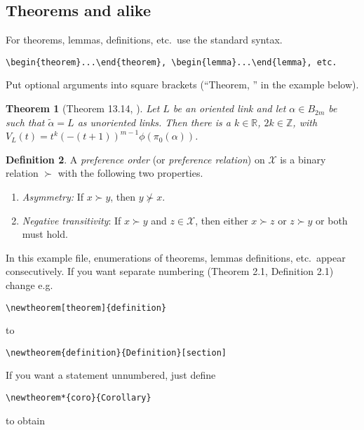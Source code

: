 \documentclass{RSMUP}
\newtheorem{theorem}{Theorem}[section]
\newtheorem{lemma}[theorem]{Lemma}
\theoremstyle{definition}
\newtheorem{definition}[theorem]{Definition}
\begin{document}
\subsection{Theorems and alike}

For theorems, lemmas, definitions, etc.\ use the standard syntax.

\begin{verbatim}
\begin{theorem}...\end{theorem}, \begin{lemma}...\end{lemma}, etc.
\end{verbatim}

Put optional arguments into square brackets (``Theorem, \cite{Jon}'' in the example below).

\begin{theorem}[Theorem 13.14, \cite{Jon}]
Let $L$  be an oriented link and let $\alpha \in B_{2m}$ be such that
$\tilde{\alpha}=L$ as unoriented links. Then there is a $k\in \mathbb{R}$, $2k \in \mathbb{Z}$,
with $V_L(t)= t^k(-(t+1))^{m-1} \phi(\pi_0(\alpha))$.
\end{theorem}

\begin{definition}
A \emph{preference order}  (or \emph{preference relation}) on $\mathcal X$ is a binary
relation $\succ$ with the following two properties.
\begin{enumerate}

\item \emph{Asymmetry:} If $x\succ y$, then $y\not\succ x$.

\item \emph{Negative transitivity}: If $x\succ y$ and $z\in{\mathcal X}$, then
          either $x\succ z$ or $z\succ y$ or both must hold.

\end{enumerate}
\end{definition}

In this example file, enumerations of theorems,
lemmas definitions, etc.\ appear consecutively.
If you want separate numbering (Theorem 2.1, Definition 2.1) change e.g.\
\begin{verbatim}
\newtheorem[theorem]{definition}
\end{verbatim}
to
\begin{verbatim}
\newtheorem{definition}{Definition}[section]
\end{verbatim}

If you want a statement unnumbered, just define
\begin{verbatim}
\newtheorem*{coro}{Corollary}
\end{verbatim}
to obtain
\end{document}
